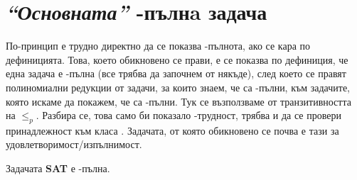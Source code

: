 \section{\textit{``Основната''} \NP-пълнa задача}

По-принцип е трудно директно да се показва \NP-пълнота, ако се кара по дефиницията.
Това, което обикновено се прави, е се показва по дефиниция, че една задача е \NP-пълна (все трябва да започнем от някъде), след което се правят полиномиални редукции от задачи, за които знаем, че са \NP-пълни, към задачите, която искаме да покажем, че са \NP-пълни.
Тук се възползваме от транзитивността на $\leq_p$.
Разбира се, това само би показало \NP-трудност, трябва и да се провери принадлежност към класа \NP.
Задачата, от която обикновено се почва е тази за удовлетворимост/изпълнимост.

\begin{theorem}
    Задачата \textbf{SAT} е \NP-пълна.
\end{theorem}

